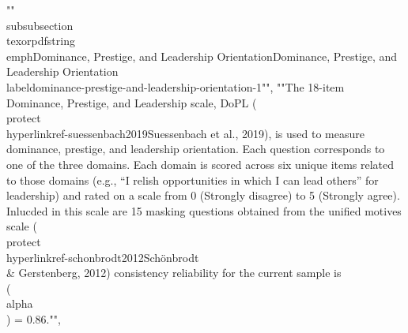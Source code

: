 {{{{{{{{{{{""\\subsubsection{\\texorpdfstring{\\emph{Dominance, Prestige, and Leadership Orientation}}{Dominance, Prestige, and Leadership Orientation}}\\label{dominance-prestige-and-leadership-orientation-1}}"", ""The 18-item Dominance, Prestige, and Leadership scale, DoPL (\\protect\\hyperlink{ref-suessenbach2019}{Suessenbach et al., 2019}), is used to measure dominance, prestige, and leadership orientation. Each question corresponds to one of the three domains. Each domain is scored across six unique items related to those domains (e.g., ``I relish opportunities in which I can lead others'' for leadership) and rated on a scale from 0 (Strongly disagree) to 5 (Strongly agree). Inlucded in this scale are 15 masking questions obtained from the unified motives scale (\\protect\\hyperlink{ref-schonbrodt2012}{Schönbrodt \\& Gerstenberg, 2012}) consistency reliability for the current sample is \\(\\alpha\\) = 0.86."", 
}}}}}}}}}}

